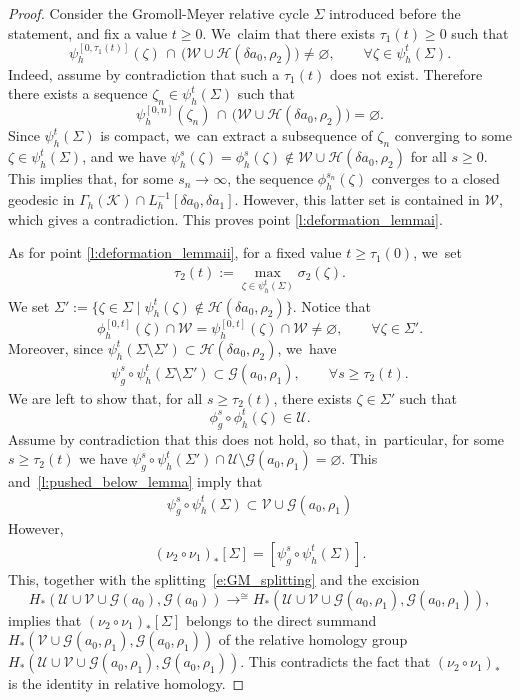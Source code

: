 \documentclass[11pt]{article}
\let\sep\mid
\newcommand{\GG}{\mathcal{G}}
\newcommand{\HH}{\mathcal{H}}
\newcommand{\KK}{\mathcal{K}}
\newcommand{\UU}{\mathcal{U}}
\newcommand{\VV}{\mathcal{V}}
\newcommand{\WW}{\mathcal{W}}
\DeclareMathOperator*{\toup}{\longrightarrow}
\let\ttoup\toup
\theoremstyle{plain}
\theoremstyle{definition}
\begin{document}
\begin{proof}
Consider the Gromoll-Meyer relative cycle $\Sigma$ introduced before the statement, and fix a value $t\geq0$. We~claim that there exists $\tau_1(t)\geq0$ such that
\[
\psi_h^{[0,\tau_1(t)]}(\zeta)\, \cap\, \big(\WW\cup\HH(\delta a_0,\rho_2)\big)\neq\varnothing,
\qquad
\forall \zeta\in\psi_h^t(\Sigma).
\]
Indeed, assume by contradiction that such a $\tau_1(t)$ does not exist. Therefore there exists a sequence $\zeta_n\in\psi_h^t(\Sigma)$ such that
\[
\psi_h^{[0,n]}(\zeta_n)\, \cap\, \big(\WW\cup\HH(\delta a_0,\rho_2)\big)=\varnothing.
\]
Since $\psi_h^t(\Sigma)$ is compact, we~can extract a subsequence of $\zeta_n$ converging to some $\zeta\in\psi_h^t(\Sigma)$, and we have $\psi_h^s(\zeta)=\phi_h^s(\zeta)\not\in\WW\cup\HH(\delta a_0,\rho_2)$ for all $s\geq0$. This implies that, for some $s_n\to\infty$, the sequence $\phi_h^{s_n}(\zeta)$ converges to a closed geodesic in $\Gamma_h(\KK)\cap L_h^{-1}[\delta a_0,\delta a_1]$. However, this latter set is contained in $\WW$, which gives a contradiction. This proves point \eqref{l:deformation_lemmai}.

As for point \eqref{l:deformation_lemmaii}, for a fixed value $t\geq\tau_1(0)$, we~set
\begin{align*}
\tau_2(t):=\max_{\zeta\in\psi_h^t(\Sigma)} \sigma_2(\zeta).
\end{align*}
We set
$\Sigma':=\big\{\zeta\in\Sigma\sep \psi_h^t(\zeta)\not\in \HH(\delta a_0,\rho_2) \big\}$.
Notice that
\[
\phi_h^{[0,t]}(\zeta)\cap \WW
=\psi_h^{[0,t]}(\zeta)\cap \WW\neq\varnothing,
\qquad\forall\zeta\in\Sigma'.
\]
Moreover, since $\psi_h^{t}(\Sigma\setminus\Sigma') \subset \HH(\delta a_0,\rho_2)$, we~have
\begin{align}
\label{l:pushed_below_lemma}
\psi_g^{s}\circ \psi_h^{t}(\Sigma\setminus\Sigma')\subset\GG(a_0,\rho_1),\qquad\forall s\geq\tau_2(t).
\end{align}
We are left to show that, for all $s\geq\tau_2(t)$, there exists $\zeta\in\Sigma'$ such that \[
\phi_g^s\circ\phi_h^t(\zeta)\in\UU.
\]
Assume by contradiction that this does not hold, so that, in~particular, for some $s\geq\tau_2(t)$ we have
$\psi_g^s\circ\psi_h^t(\Sigma')\cap\UU\setminus\GG(a_0,\rho_1)=\varnothing$. This and~\eqref{l:pushed_below_lemma} imply that
\begin{align*}
\psi_g^s\circ\psi_h^t(\Sigma)
\subset
\VV\cup\GG(a_0,\rho_1)
\end{align*}
However,
\begin{align*}
(\nu_2\circ\nu_1)_*[\Sigma]=[\psi_g^s\circ\psi_h^t(\Sigma)].
\end{align*}
This, together with the splitting~\eqref{e:GM_splitting} and the excision
\[
H_*(\UU\cup\VV\cup\GG(a_0) , \GG(a_0))
\ttoup^{\cong}
H_*(\UU\cup\VV\cup\GG(a_0,\rho_1) , \GG(a_0,\rho_1)),
\]
implies that $(\nu_2\circ\nu_1)_*[\Sigma]$ belongs to the direct summand $H_*(\VV\cup\GG(a_0,\rho_1) , \GG(a_0,\rho_1))$ of the relative homology group $H_*(\UU\cup\VV\cup\GG(a_0,\rho_1) , \GG(a_0,\rho_1))$. This contradicts the fact that $(\nu_2\circ\nu_1)_*$ is the identity in relative homology.
\end{proof}
\end{document}
